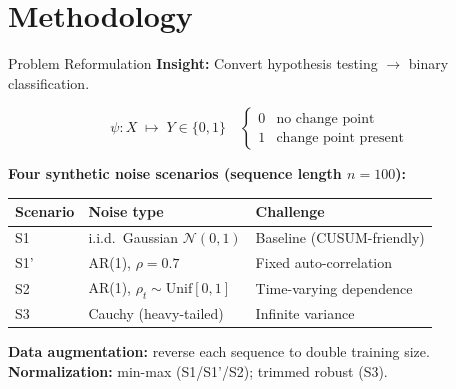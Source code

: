 \documentclass[8.5pt]{beamer}
\begin{document}
\section{Methodology}

\begin{frame}{Problem Reformulation \cite{li2024automatic}}
  \textbf{Insight:} Convert hypothesis testing $\to$ binary classification.

  \[
    \psi: X \;\mapsto\; Y \in \{0, 1\}
    \quad
    \begin{cases} 0 & \text{no change point} \\ 1 & \text{change point present} \end{cases}
  \]

  \bigskip
  \textbf{Four synthetic noise scenarios (sequence length $n = 100$):}
  \begin{center}
  \begin{tabular}{@{}lll@{}}
    \toprule
    Scenario & Noise type & Challenge \\
    \midrule
    S1  & i.i.d.\ Gaussian $\mathcal{N}(0,1)$ & Baseline (CUSUM-friendly) \\
    S1' & AR(1), $\rho = 0.7$ & Fixed auto-correlation \\
    S2  & AR(1), $\rho_t \sim \text{Unif}[0,1]$ & Time-varying dependence \\
    S3  & Cauchy (heavy-tailed) & Infinite variance \\
    \bottomrule
  \end{tabular}
  \end{center}

  \bigskip
  \textbf{Data augmentation:} reverse each sequence to double training size.\\
  \textbf{Normalization:} min-max (S1/S1'/S2); trimmed robust (S3).
\end{frame}
\end{document}
